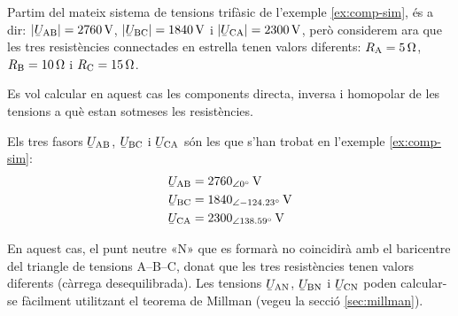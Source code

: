 \begin{exemple}\label{ex:comp-sim-deseq}
    Partim del mateix sistema de tensions trifàsic de l'exemple \vref{ex:comp-sim}, és a dir: $|\cmplx{U}\ped{AB}| =  \SI{2760}{V}$, $|\cmplx{U}\ped{BC}| = \SI{1840}{V}$ i
    $|\cmplx{U}\ped{CA}| = \SI{2300}{V}$, però considerem ara que les tres resistències connectades en estrella tenen valors diferents:  $R_\mathrm{A}=\SI{5}{\ohm}$, $R_\mathrm{B}=\SI{10}{\ohm}$ i $R_\mathrm{C}=\SI{15}{\ohm}$.

    \begin{center}
        
    \end{center}

    Es vol calcular en aquest cas  les components directa, inversa i homopolar de les tensions a què estan sotmeses les resistències.

    Els tres fasors $\cmplx{U}\ped{AB} $, $\cmplx{U}\ped{BC} $ i $\cmplx{U}\ped{CA}$ són les que s'han trobat en l'exemple \ref{ex:comp-sim}:
    \begin{align*}
        \cmplx{U}\ped{AB} &= \SIpd{2760}{0}{V} \\
        \cmplx{U}\ped{BC} &= \SIpd{1840}{-124,23}{V} \\
        \cmplx{U}\ped{CA} &= \SIpd{2300}{138,59}{V}
    \end{align*}

    En aquest cas, el punt neutre «N» que es formarà no coincidirà amb el baricentre del triangle de tensions A--B--C, donat que les tres resistències tenen valors diferents (càrrega  desequilibrada). Les tensions $\cmplx{U}\ped{AN} $, $\cmplx{U}\ped{BN} $ i $\cmplx{U}\ped{CN}$ poden calcular-se fàcilment utilitzant el teorema de Millman (vegeu la secció \vref{sec:millman}).


\end{exemple}
